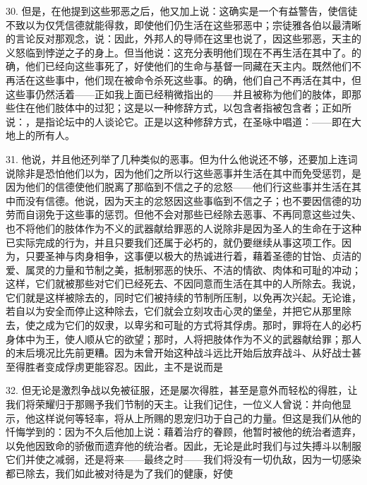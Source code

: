 30. 但是，在他提到这些邪恶之后，他又加上说：这确实是一个有益警告，使信徒不致以为仅凭信德就能得救，即使他们仍生活在这些邪恶中；宗徒雅各伯以最清晰的言论反对那观念，说：因此，外邦人的导师在这里也说了，因这些邪恶，天主的义怒临到悖逆之子的身上。但当他说：这充分表明他们现在不再生活在其中了。的确，他们已经向这些事死了，好使他们的生命与基督一同藏在天主内。既然他们不再活在这些事中，他们现在被命令杀死这些事。的确，他们自己不再活在其中，但这些事仍然活着——正如我上面已经稍微指出的——并且被称为他们的肢体，即那些住在他们肢体中的过犯；这是以一种修辞方式，以包含者指被包含者；正如所说：，是指论坛中的人谈论它。正是以这种修辞方式，在圣咏中唱道：——即在大地上的所有人。\par

31. 他说，并且他还列举了几种类似的恶事。但为什么他说还不够，还要加上连词说除非是恐怕他们以为，因为他们之所以行这些恶事并生活在其中而免受惩罚，是因为他们的信德使他们脱离了那临到不信之子的忿怒——他们行这些事并生活在其中而没有信德。他说，因为天主的忿怒因这些事临到不信之子；也不要因信德的功劳而自诩免于这些事的惩罚。但他不会对那些已经除去恶事、不再同意这些过失、也不将他们的肢体作为不义的武器献给罪恶的人说除非是因为圣人的生命在于这种已实际完成的行为，并且只要我们还属于必朽的，就仍要继续从事这项工作。因为，只要圣神与肉身相争，这事便以极大的热诚进行着，藉着圣德的甘饴、贞洁的爱、属灵的力量和节制之美，抵制邪恶的快乐、不洁的情欲、肉体和可耻的冲动；这样，它们就被那些对它们已经死去、不因同意而生活在其中的人所除去。我说，它们就是这样被除去的，同时它们被持续的节制所压制，以免再次兴起。无论谁，若自以为安全而停止这种除去，它们就会立刻攻击心灵的堡垒，并把它从那里除去，使之成为它们的奴隶，以卑劣和可耻的方式将其俘虏。那时，罪将在人的必朽身体中为王，使人顺从它的欲望；那时，人将把肢体作为不义的武器献给罪；那人的末后境况比先前更糟。因为未曾开始这种战斗远比开始后放弃战斗、从好战士甚至得胜者变成俘虏更能容忍。因此，主不是说而是\par

32. 但无论是激烈争战以免被征服，还是屡次得胜，甚至是意外而轻松的得胜，让我们将荣耀归于那赐予我们节制的天主。让我们记住，一位义人曾说：并向他显示，他这样说何等轻率，将从上所赐的恩宠归功于自己的力量。但这是我们从他的忏悔学到的：因为不久后他加上说：藉着治疗的眷顾，他暂时被他的统治者遗弃，以免他因致命的骄傲而遗弃他的统治者。因此，无论是此时我们与过失搏斗以制服它们并使之减弱，还是将来——最终之时——我们将没有一切仇敌，因为一切感染都已除去，我们如此被对待是为了我们的健康，好使\par

